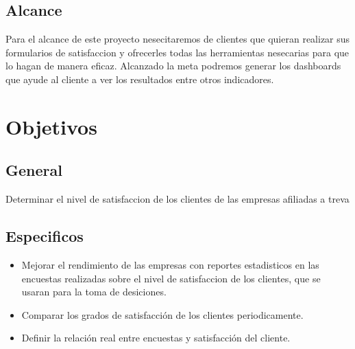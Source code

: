 \documentclass[twoside,twocolumn]{article}
\begin{document}
\subsection{Alcance}
Para el alcance de este proyecto nesecitaremos de clientes que quieran realizar sus formularios de satisfaccion y ofrecerles todas las herramientas nesecarias para que lo hagan de manera eficaz. Alcanzado la meta podremos generar los dashboards que ayude al cliente a ver los resultados entre otros indicadores.


\section{Objetivos}
\subsection{General}
Determinar el nivel de satisfaccion de los clientes de las empresas afiliadas a treva

\subsection{Especificos}
\begin{itemize}
\item Mejorar el rendimiento de las empresas con reportes estadisticos en las encuestas realizadas sobre el nivel de satisfaccion de los clientes, que se usaran para la toma de desiciones.
\item Comparar los grados de satisfacción de los clientes periodicamente.
\item Definir la relación real entre encuestas y satisfacción del cliente.
\end{itemize}
\end{document}
